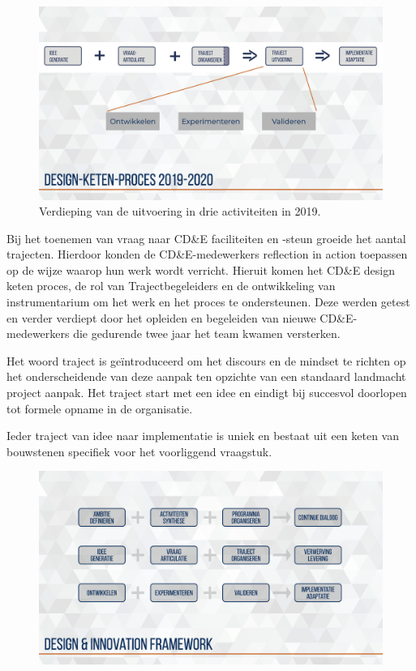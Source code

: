 \documentclass[
]{book}
\begin{document}
\begin{figure}

{\centering \includegraphics[width=0.5\linewidth]{data/keynote-slides/20200430-CDE-Designprocess/20200430-CDE-Designprocess.026} 

}

\caption{Verdieping van de uitvoering in drie activiteiten in 2019. }\label{fig:unnamed-chunk-23}
\end{figure}

Bij het toenemen van vraag naar CD\&E faciliteiten en -steun groeide het aantal trajecten. Hierdoor konden de CD\&E-medewerkers reflection in action toepassen op de wijze waarop hun werk wordt verricht. Hieruit komen het CD\&E design keten proces, de rol van Trajectbegeleiders en de ontwikkeling van instrumentarium om het werk en het proces te ondersteunen. Deze werden getest en verder verdiept door het opleiden en begeleiden van nieuwe CD\&E-medewerkers die gedurende twee jaar het team kwamen versterken.

Het woord traject is geïntroduceerd om het discours en de mindset te richten op het onderscheidende van deze aanpak ten opzichte van een standaard landmacht project aanpak. Het traject start met een idee en eindigt bij succesvol doorlopen tot formele opname in de organisatie.

Ieder traject van idee naar implementatie is uniek en bestaat uit een keten van bouwstenen specifiek voor het voorliggend vraagstuk.

\begin{figure}

{\centering \includegraphics[width=0.5\linewidth]{data/keynote-slides/20200430-CDE-Designprocess/20200430-CDE-Designprocess.027} 

}

\caption{ }\label{fig:unnamed-chunk-24}
\end{figure}
\end{document}

